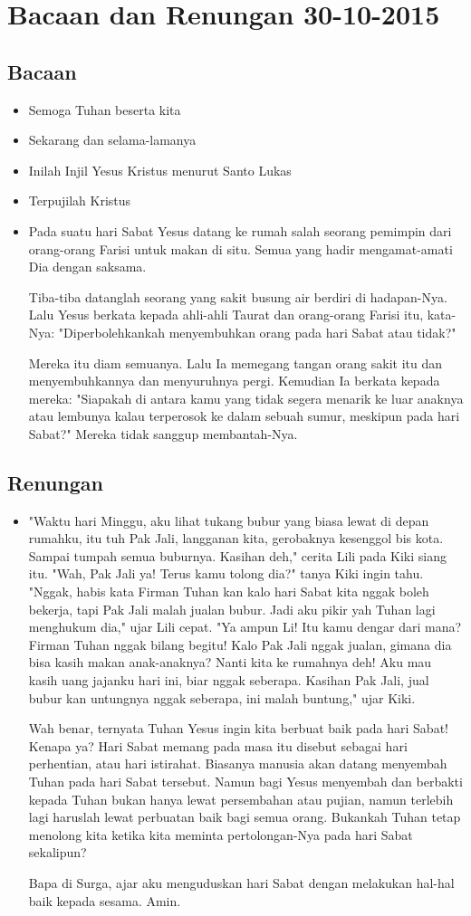 \documentclass[12pt,a4paper]{article}
\author{Yohanes Suyanto}
\newcommand{\BU}[1]{\begin{itemize} \item[U:] #1 \end{itemize}}
\newcommand{\BP}[1]{\begin{itemize} \item[P:] #1 \end{itemize}}
\begin{document}
\large
\section*{Bacaan dan Renungan 30-10-2015}
\subsection*{Bacaan}
\BP{Semoga Tuhan beserta kita}
\BU{Sekarang dan selama-lamanya}
\BP{Inilah Injil Yesus Kristus menurut Santo Lukas}
\BU{Terpujilah Kristus}
\BP{Pada suatu hari Sabat Yesus datang ke rumah salah seorang pemimpin dari orang-orang Farisi untuk makan di situ. Semua yang hadir mengamat-amati Dia dengan saksama.

Tiba-tiba datanglah seorang yang sakit busung air berdiri di hadapan-Nya.
Lalu Yesus berkata kepada ahli-ahli Taurat dan orang-orang Farisi itu, kata-Nya: "Diperbolehkankah menyembuhkan orang pada hari Sabat atau tidak?"

Mereka itu diam semuanya. Lalu Ia memegang tangan orang sakit itu dan menyembuhkannya dan menyuruhnya pergi.
Kemudian Ia berkata kepada mereka: "Siapakah di antara kamu yang tidak segera menarik ke luar anaknya atau lembunya kalau terperosok ke dalam sebuah sumur, meskipun pada hari Sabat?"
Mereka tidak sanggup membantah-Nya.
}

\subsection*{Renungan}
\BP{
"Waktu hari Minggu, aku lihat tukang bubur yang biasa lewat di depan rumahku, itu tuh Pak Jali, langganan kita, gerobaknya kesenggol bis kota. Sampai tumpah semua buburnya. Kasihan deh," cerita Lili pada Kiki siang itu. "Wah, Pak Jali ya! Terus kamu tolong dia?" tanya Kiki ingin tahu. "Nggak, habis kata Firman Tuhan kan kalo hari Sabat kita nggak boleh bekerja, tapi Pak Jali malah jualan bubur. Jadi aku pikir yah Tuhan lagi menghukum dia," ujar Lili cepat. "Ya ampun Li! Itu kamu dengar dari mana? Firman Tuhan nggak bilang begitu! Kalo Pak Jali nggak jualan, gimana dia bisa kasih makan anak-anaknya? Nanti kita ke rumahnya deh! Aku mau kasih uang jajanku hari ini, biar nggak seberapa. Kasihan Pak Jali, jual bubur kan untungnya nggak seberapa, ini malah buntung," ujar Kiki.

Wah benar, ternyata Tuhan Yesus ingin kita berbuat baik pada hari Sabat! Kenapa ya? Hari Sabat memang pada masa itu disebut sebagai hari perhentian, atau hari istirahat. Biasanya manusia akan datang menyembah Tuhan pada hari Sabat tersebut. Namun bagi Yesus menyembah dan berbakti kepada Tuhan bukan hanya lewat persembahan atau pujian, namun terlebih lagi haruslah lewat perbuatan baik bagi semua orang. Bukankah Tuhan tetap menolong kita ketika kita meminta pertolongan-Nya pada hari Sabat sekalipun?

Bapa di Surga, ajar aku menguduskan hari Sabat dengan melakukan hal-hal baik kepada sesama. Amin.
}
\end{document}
